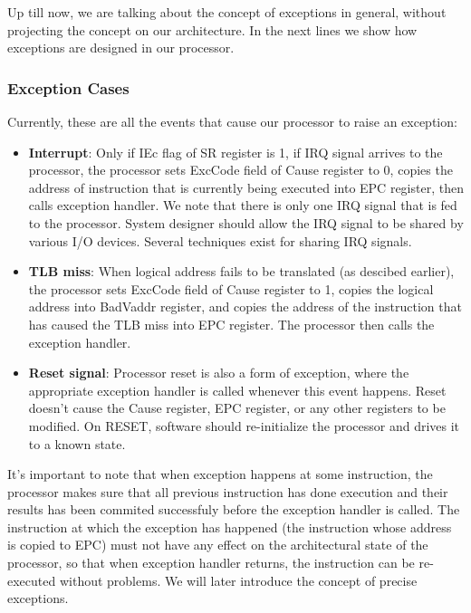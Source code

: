 \documentclass[oneside]{book}
\begin{document}
Up till now, we are talking about the concept of exceptions in
general, without projecting the concept on our architecture.
In the next lines we show how exceptions are designed in
our processor.

\subsubsection{Exception Cases}

Currently, these are all the events that cause our processor
to raise an exception:

\begin{itemize}

\item \textbf{Interrupt}: Only if IEc flag of SR register is 1,
      if IRQ signal arrives to the processor, the processor
      sets ExcCode field of Cause register to 0, copies the
      address of instruction that is currently being executed
      into EPC register, then calls exception handler. We note
      that there is only one IRQ signal that is fed to the processor.
      System designer should allow the IRQ signal to be shared by various
      I/O devices. Several techniques exist for sharing IRQ
      signals.

\item \textbf{TLB miss}: When logical address fails to be
      translated (as descibed earlier), the processor
      sets ExcCode field of Cause register to 1,
      copies the logical address into BadVaddr register,
      and copies the address of the instruction that
      has caused the TLB miss into EPC register. The processor
      then calls the exception handler.

\item \textbf{Reset signal}: Processor reset is also a form
      of exception, where the appropriate exception handler is
      called whenever this event happens. Reset doesn't cause
      the Cause register, EPC register, or any other registers
      to be modified. On RESET, software should re-initialize
      the processor and drives it to a known state.

\end{itemize}

It's important to note that when exception happens at some instruction,
the processor makes sure that all previous instruction has done execution
and their results has been commited successfuly before the exception
handler is called. The instruction at which the exception has happened
(the instruction whose address is copied to EPC) must not have
any effect on the architectural state of the processor, so that
when exception handler returns, the instruction can be re-executed
without problems. We will later introduce the concept of precise
exceptions.
\end{document}
